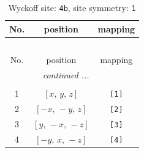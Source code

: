 \documentclass[fleqn,8pt]{jsarticle}
\begin{document}
\begin{longtable}{ccc}
\caption{Wyckoff site: {\tt 4b}, site symmetry: {\tt 1}}
 \\
 \hline \hline
No. & position & mapping \\ \hline \endfirsthead

\multicolumn{2}{l}{\tablename\ \thetable{}} \\
 \hline \hline
No. & position & mapping \\ \hline \endhead

 \hline \hline
\multicolumn{2}{r}{\footnotesize\it continued ...} \\ \endfoot

 \hline \hline
\multicolumn{2}{r}{} \\ \endlastfoot

1 & $\left[ x,\, y,\, z \right]$ & {\tt [1]} \\ \hline
2 & $\left[ - x,\, - y,\, z \right]$ & {\tt [2]} \\ \hline
3 & $\left[ y,\, - x,\, - z \right]$ & {\tt [3]} \\ \hline
4 & $\left[ - y,\, x,\, - z \right]$ & {\tt [4]} \\
\end{longtable}
\end{document}
